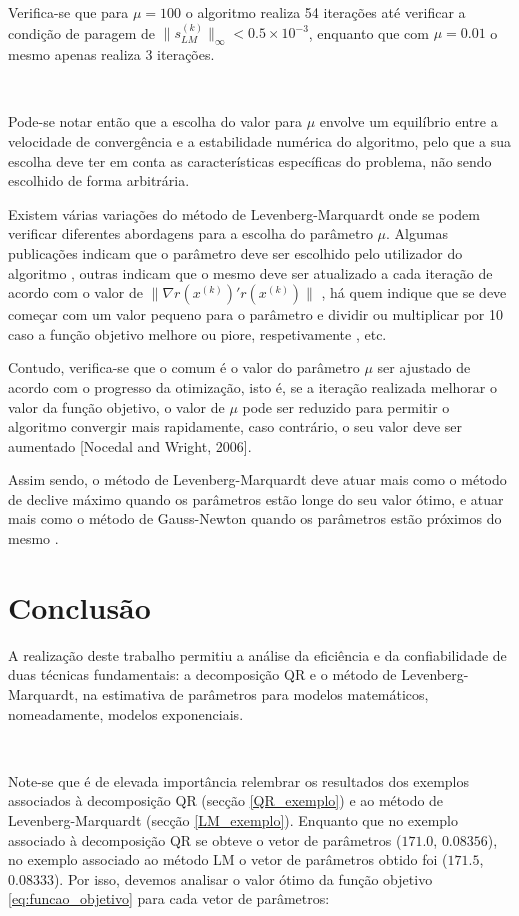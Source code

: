 \documentclass[]{article}
\numberwithin{equation}{subsection}
\begin{document}
Verifica-se que para \(\mu=100\) o algoritmo realiza 54 iterações até
verificar a condição de paragem de
\(\|s^{(k)}_{LM}\|_{\infty}<0.5 \times 10^{-3}\), enquanto que com
\(\mu=0.01\) o mesmo apenas realiza 3 iterações.

\(\ \)

Pode-se notar então que a escolha do valor para \(\mu\) envolve um
equilíbrio entre a velocidade de convergência e a estabilidade numérica
do algoritmo, pelo que a sua escolha deve ter em conta as
características específicas do problema, não sendo escolhido de forma
arbitrária.

Existem várias variações do método de Levenberg-Marquardt onde se podem
verificar diferentes abordagens para a escolha do parâmetro \(\mu\).
Algumas publicações indicam que o parâmetro deve ser escolhido pelo
utilizador do algoritmo \cite{DM63}, outras indicam que o mesmo deve ser
atualizado a cada iteração de acordo com o valor de
\(\| \nabla r(x^{(k)})' r(x^{(k)}) \|\) \cite{LCYM23}, há quem indique
que se deve começar com um valor pequeno para o parâmetro e dividir ou
multiplicar por 10 caso a função objetivo melhore ou piore,
respetivamente \cite{PC07}, etc.

Contudo, verifica-se que o comum é o valor do parâmetro \(\mu\) ser
ajustado de acordo com o progresso da otimização, isto é, se a iteração
realizada melhorar o valor da função objetivo, o valor de \(\mu\) pode
ser reduzido para permitir o algoritmo convergir mais rapidamente, caso
contrário, o seu valor deve ser aumentado {[}Nocedal and Wright,
2006{]}. \textcolor{white}{\cite{JNSW06}}

Assim sendo, o método de Levenberg-Marquardt deve atuar mais como o
método de declive máximo quando os parâmetros estão longe do seu valor
ótimo, e atuar mais como o método de Gauss-Newton quando os parâmetros
estão próximos do mesmo \cite{HPG22}.

\newpage
\section{Conclusão}

A realização deste trabalho permitiu a análise da eficiência e da
confiabilidade de duas técnicas fundamentais: a decomposição QR e o
método de Levenberg-Marquardt, na estimativa de parâmetros para modelos
matemáticos, nomeadamente, modelos exponenciais.

\(\ \)

Note-se que é de elevada importância relembrar os resultados dos
exemplos associados à decomposição QR (secção \ref{QR_exemplo}) e ao
método de Levenberg-Marquardt (secção \ref{LM_exemplo}). Enquanto que no
exemplo associado à decomposição QR se obteve o vetor de parâmetros
(\(171.0\), \(0.08356\)), no exemplo associado ao método LM o vetor de
parâmetros obtido foi (\(171.5\), \(0.08333\)). Por isso, devemos
analisar o valor ótimo da função objetivo \ref{eq:funcao_objetivo} para
cada vetor de parâmetros:
\end{document}
